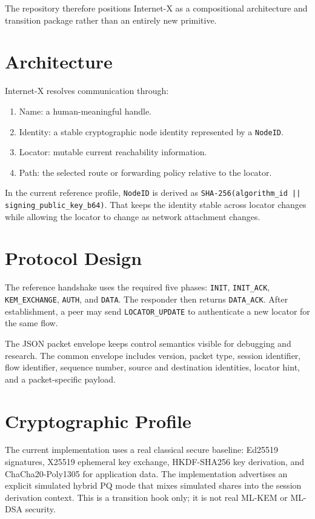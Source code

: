 \documentclass[11pt]{article}
\begin{document}
The repository therefore positions Internet-X as a compositional architecture and transition package rather than an entirely new primitive.

\section{Architecture}
Internet-X resolves communication through:
\begin{enumerate}[leftmargin=*]
\item Name: a human-meaningful handle.
\item Identity: a stable cryptographic node identity represented by a \texttt{NodeID}.
\item Locator: mutable current reachability information.
\item Path: the selected route or forwarding policy relative to the locator.
\end{enumerate}

In the current reference profile, \texttt{NodeID} is derived as \texttt{SHA-256(algorithm\_id || signing\_public\_key\_b64)}. That keeps the identity stable across locator changes while allowing the locator to change as network attachment changes.

\section{Protocol Design}
The reference handshake uses the required five phases: \texttt{INIT}, \texttt{INIT\_ACK}, \texttt{KEM\_EXCHANGE}, \texttt{AUTH}, and \texttt{DATA}. The responder then returns \texttt{DATA\_ACK}. After establishment, a peer may send \texttt{LOCATOR\_UPDATE} to authenticate a new locator for the same flow.

The JSON packet envelope keeps control semantics visible for debugging and research. The common envelope includes version, packet type, session identifier, flow identifier, sequence number, source and destination identities, locator hint, and a packet-specific payload.

\section{Cryptographic Profile}
The current implementation uses a real classical secure baseline: Ed25519 signatures, X25519 ephemeral key exchange, HKDF-SHA256 key derivation, and ChaCha20-Poly1305 for application data. The implementation advertises an explicit simulated hybrid PQ mode that mixes simulated shares into the session derivation context. This is a transition hook only; it is not real ML-KEM or ML-DSA security.
\end{document}
